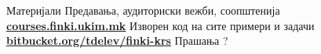 \begin{frame}{Материјали}{}
	Предавања, аудиториски вежби, соопштенија\\
	\href{http://courses.finki.ukim.mk/}{\textbf{courses.finki.ukim.mk}}
	\vfill
	Изворен код на сите примери и задачи\\
	\href{http://bitbucket.org/tdelev/finki-krs/}{\textbf{bitbucket.org/tdelev/finki-krs}}
	\vfill
	{\Huge Прашања ?}
\end{frame}


